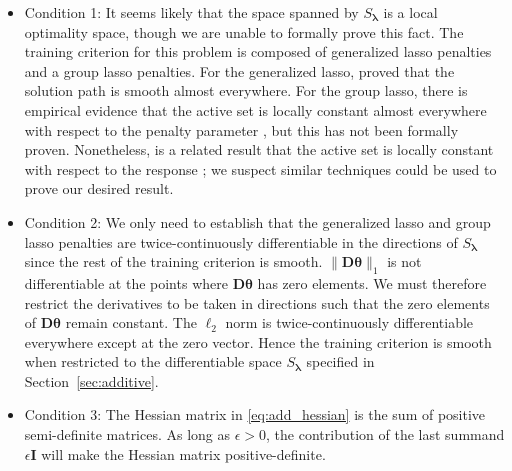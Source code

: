 \documentclass[12pt,letterpaper]{article}
\begin{document}
\begin{itemize}
	\item[] Condition 1: It seems likely that the space spanned by $S_{\boldsymbol{\lambda}}$ is a local optimality space, though we are unable to formally prove this fact. The training criterion for this problem is composed of generalized lasso penalties and a group lasso penalties. For the generalized lasso, \citet{tibshirani2011solution} proved that the solution path is smooth almost everywhere. For the group lasso, there is empirical evidence that the active set is locally constant almost everywhere with respect to the penalty parameter \citep{yuan2006model}, but this has not been formally proven. Nonetheless, is a related result that the active set is locally constant with respect to the response \citep{vaiter2012degrees}; we suspect similar techniques could be used to prove our desired result.
	\item[] Condition 2:  We only need to establish that the generalized lasso and group lasso penalties are twice-continuously differentiable in the directions of $S_{\boldsymbol{\lambda}}$ since the rest of the training criterion is smooth. 
	$\| \boldsymbol{D} \boldsymbol{\theta} \|_1$ is not differentiable at the points where $\boldsymbol{D} \boldsymbol{\theta}$ has zero elements. We must therefore restrict the derivatives to be taken in directions such that the zero elements of $\boldsymbol{D} \boldsymbol{\theta}$ remain constant. The $\ell_2$ norm is twice-continuously differentiable everywhere except at the zero vector. Hence the training criterion is smooth when restricted to the differentiable space $S_{\boldsymbol{\lambda}}$ specified in Section~\ref{sec:additive}.
	\hfill {}
	\item[] Condition 3: The Hessian matrix in \eqref{eq:add_hessian} is the sum of positive semi-definite matrices. As long as $\epsilon > 0$, the contribution of the last summand $\epsilon \boldsymbol{I}$ will make the Hessian matrix positive-definite. \hfill {}
\end{itemize}
\end{document}
